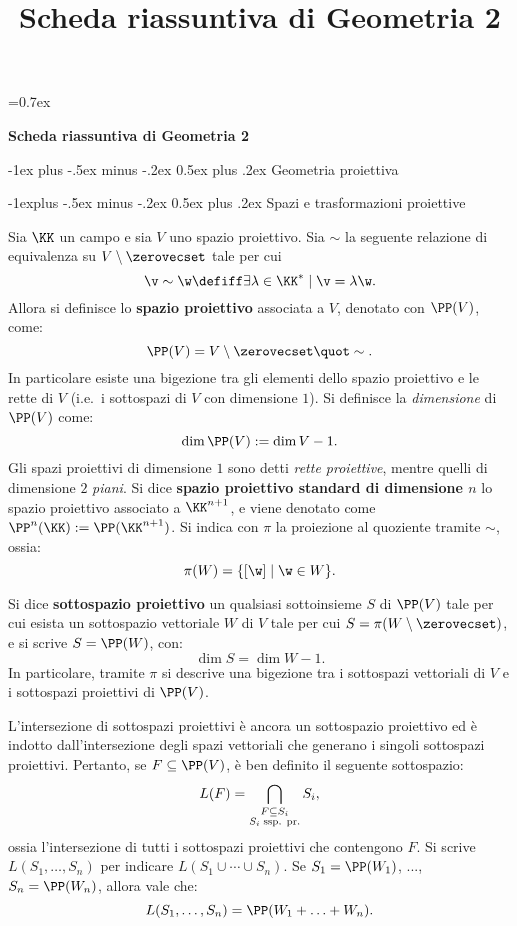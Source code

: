 \documentclass[10pt,landscape]{article}
\title{Scheda riassuntiva di Geometria 2}
\makeatletter
\renewcommand{\section}{\@startsection{section}{1}{0mm}%
	{-1ex plus -.5ex minus -.2ex}%
	{0.5ex plus .2ex}%
	{\normalfont\large\bfseries}}
\renewcommand{\subsection}{\@startsection{subsection}{2}{0mm}%
	{-1explus -.5ex minus -.2ex}%
	{0.5ex plus .2ex}%
	{\normalfont\normalsize\bfseries}}
\makeatother
\begin{document}
	
	\parskip=0.7ex
	
	\raggedright
	\footnotesize
	
	\begin{center}
		\Large{\textbf{Scheda riassuntiva di Geometria 2}} \\
	\end{center}
	\begin{multicols}{3}
		\setlength{\premulticols}{1pt}
		\setlength{\postmulticols}{1pt}
		\setlength{\multicolsep}{1pt}
		\setlength{\columnsep}{2pt}
		
		\section{Geometria proiettiva}
		
		\subsection{Spazi e trasformazioni proiettive}

		Sia $\KK$ un campo e sia $V$ uno spazio proiettivo. Sia $\sim$ la seguente
		relazione di equivalenza su $V \setminus \zerovecset$ tale per cui
		\[ \v \sim \w \defiff \exists \lambda \in \KK^* \mid \v = \lambda \w. \]
		Allora si definisce lo \textbf{spazio proiettivo} associata a $V$, denotato
		con $\PP(V)$, come:
		\[ \PP(V) = V \setminus \zerovecset \quot \sim. \]
		In particolare esiste una bigezione tra gli elementi dello spazio proiettivo
		e le rette di $V$ (i.e.~i sottospazi di $V$ con dimensione $1$). Si definisce
		la \textit{dimensione} di $\PP(V)$ come:
		\[ \dim \PP(V) := \dim V - 1. \]
		Gli spazi proiettivi di dimensione $1$ sono detti \textit{rette proiettive},
		mentre quelli di dimensione $2$ \textit{piani}. Si dice
		\textbf{spazio proiettivo standard di dimensione $n$} lo spazio proiettivo
		associato a $\KK^{n+1}$, e viene denotato come $\PP^n(\KK) := \PP(\KK^{n+1})$.
		Si indica con $\pi$ la proiezione al quoziente tramite $\sim$, ossia:
		\[ \pi(W) = \{ [\w] \mid \w \in W \}. \]
		
		
		Si dice \textbf{sottospazio proiettivo} un qualsiasi sottoinsieme $S$ di $\PP(V)$
		tale per cui esista un sottospazio vettoriale $W$ di $V$ tale per cui
		$S = \pi(W \setminus \zerovecset)$, e si scrive $S = \PP(W)$, con:
		\[ \dim S = \dim W - 1. \]
		In particolare, tramite $\pi$ si descrive una bigezione tra i sottospazi vettoriali di 
		$V$ e i sottospazi proiettivi di $\PP(V)$. \medskip
		
		
		L'intersezione di sottospazi proiettivi è ancora un sottospazio proiettivo ed
		è indotto dall'intersezione degli spazi vettoriali che generano i singoli
		sottospazi proiettivi. Pertanto, se $F \subseteq \PP(V)$, è ben definito
		il seguente sottospazio:
		\[ \displaystyle L(F) = \bigcap_{\substack{F \subseteq S_i \\ S_i \text{\;ssp. pr.}}} S_i, \]
		ossia l'intersezione di tutti i sottospazi proiettivi che contengono $F$.
		Si scrive $L(S_1, \ldots, S_n)$ per indicare $L(S_1 \cup \cdots \cup S_n)$.
		Se $S_1 = \PP(W_1)$, ..., $S_n = \PP(W_n)$, allora vale che:
		\[ L(S_1, \ldots, S_n) = \PP(W_1 + \ldots + W_n). \]
		

\end{multicols}
\end{document}
